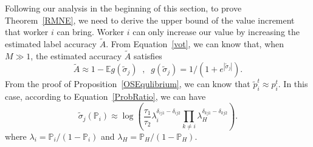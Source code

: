 %
%
%

Following our analysis in the beginning of this section, to prove Theorem~\ref{RMNE}, we need to derive the upper bound of the value increment that worker $i$ can bring.
Worker $i$ can only increase our value by increasing the estimated label accuracy $\tilde{A}$.
From Equation~\ref{vot}, we can know that, when $M\gg 1$, the estimated accuracy $\tilde{A}$ satisfies
\begin{equation}
\label{accP}
\tilde{A} \approx 1-\mathbb{E}g(\tilde{\sigma}_j)\;\;,\;\; g(\tilde{\sigma}_j)=1/(1+e^{|\tilde{\sigma}_j|}).
\end{equation}
From the proof of Proposition~\ref{OSEqulibrium}, we can know that $\tilde{p}^{t}_i \approx p^{t}_i$.
In this case, according to Equation~\ref{ProbRatio}, we can have
\begin{equation}
\label{ProbRatioApp}
\tilde{\sigma}_j(\mathbb{P}_i)\approx \log\left(\frac{\tau_{1}}{\tau_{2}}\lambda_i^{\delta_{ij1}-\delta_{ij2}}{\prod}_{k\neq i}\lambda_H^{\delta_{kj1}-\delta_{kj2}}\right).
\end{equation}
where $\lambda_i=\mathbb{P}_i/(1-\mathbb{P}_i)$ and $\lambda_H=\mathbb{P}_H/(1-\mathbb{P}_H)$.

